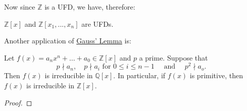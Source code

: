 Now since $\mathbb{Z}$ is a UFD, we have, therefore:

\begin{crly}
\label{crly:polynomial_ring_over_integers_is_a_ufd}
  $\mathbb{Z}[x]$ and $\mathbb{Z}[x_1, ..., x_n]$ are UFDs.
\end{crly}

Another application of \hyperref[thm:gauss_lemma]{Gauss' Lemma} is:

\begin{thm}
\label{thm:eisenstein_s_criterion_of_z_x_}
Let $f(x) = a_n x^n + \hdots + a_0 \in \mathbb{Z}[x]$ and $p$ a prime. Suppose that
\begin{equation*}
  p \nmid a_n, \quad p \nmid a_i \text{ for } 0 \leq i \leq n - 1 \quad \text{ and } \quad p^2 \nmid a_o.
\end{equation*}
Then $f(x)$ is irreducible in $\mathbb{Q}[x]$. In particular, if $f(x)$ is primitive, then $f(x)$ is irreducible in $\mathbb{Z}[x]$.
\end{thm}

\begin{proof}
\end{proof}



